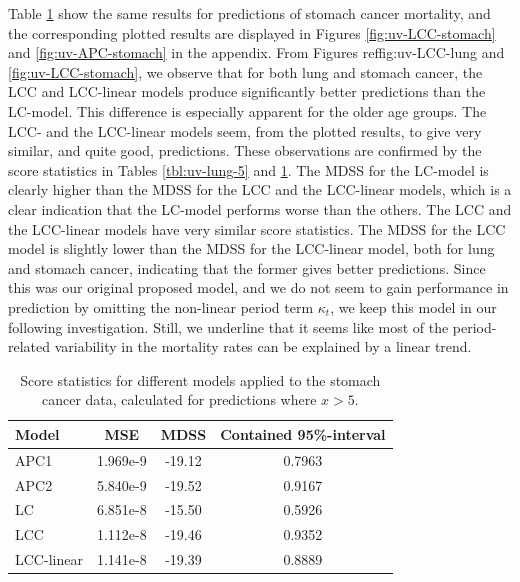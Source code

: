 Table \ref{tbl:uv-stomach-5} show the same results for predictions of stomach cancer mortality, and the corresponding plotted results are displayed in Figures \ref{fig:uv-LCC-stomach} and \ref{fig:uv-APC-stomach} in the appendix. 
\newpar From Figures ref{fig:uv-LCC-lung} and \ref{fig:uv-LCC-stomach}, we observe that for both lung and stomach cancer, the LCC and LCC-linear models produce significantly better predictions than the LC-model. This difference is especially apparent for the older age groups. The LCC- and the LCC-linear models seem, from the plotted results, to give very similar, and quite good, predictions. These observations are confirmed by the score statistics in Tables \ref{tbl:uv-lung-5} and \ref{tbl:uv-stomach-5}. The MDSS for the LC-model is clearly higher than the MDSS for the LCC and the LCC-linear models, which is a clear indication that the LC-model performs worse than the others. The LCC and the LCC-linear models have very similar score statistics. The MDSS for the LCC model is slightly lower than the MDSS for the LCC-linear model, both for lung and stomach cancer, indicating that the former gives better predictions. Since this was our original proposed model, and we do not seem to gain performance in prediction by omitting the non-linear period term $\kappa_t$, we keep this model in our following investigation. Still, we underline that it seems like most of the period-related variability in the mortality rates can be explained by a linear trend.

\begin{table}
    \begin{center}
        \begin{tabular}{l |c c c }
            Model & MSE &   MDSS & Contained 95\%-interval\\
            \hline
            APC1     & 1.969e-9 & -19.12    & 0.7963 \\
            APC2     & 5.840e-9 & -19.52    & 0.9167 \\
            LC      & 6.851e-8 & -15.50    & 0.5926 \\
            LCC     & 1.112e-8 & -19.46    & 0.9352 \\
            LCC-linear      & 1.141e-8 & -19.39    & 0.8889
        \end{tabular}
        \caption{Score statistics for different models applied to the stomach cancer data, calculated for predictions where $x > 5$.}\label{tbl:uv-stomach-5}
    \end{center}
\end{table}

